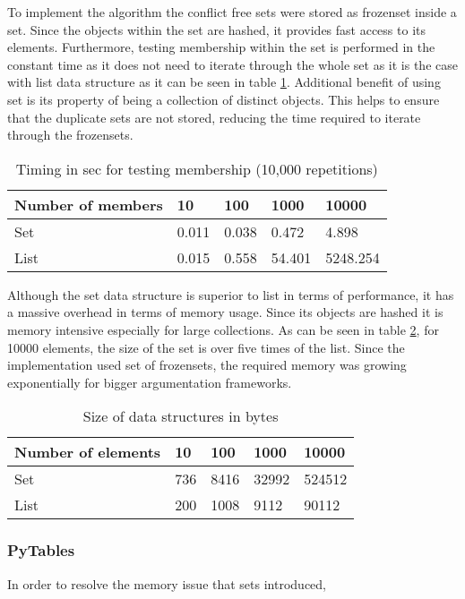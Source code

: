 To implement the algorithm the conflict free sets were stored as frozenset inside a set. Since the objects within the set are hashed, it provides fast access to its elements. Furthermore, testing membership within the set is performed in the constant time as it does not need to iterate through the whole set as it is the case with list data structure as it can be seen in table \ref{table:timingsMembership}. Additional benefit of using set is its property of being a collection of distinct objects. This helps to ensure that the duplicate sets are not stored, reducing the time required to iterate through the frozensets.

\begin{table}[h]
	\centering
	\caption{Timing in sec for testing membership (10,000 repetitions)}
	\label{table:timingsMembership}
	\begin{tabular}{lllll}
		\hline
		Number of members & 10    & 100   & 1000   & 10000 \\ \hline
		Set                & 0.011 & 0.038 & 0.472  & 4.898 \\
		List               & 0.015 & 0.558 & 54.401 & 5248.254 \\     
	\end{tabular}
\end{table}

Although the set data structure is superior to list in terms of performance, it has a massive overhead in terms of memory usage. Since its objects are hashed it is memory intensive especially for large collections. As can be seen in table \ref{table:sizeDataStructures}, for 10000 elements, the size of the set is over five times of the list. Since the implementation used set of frozensets, the required memory was growing exponentially for bigger argumentation frameworks.

\begin{table}[h]	
	\centering
	\caption{Size of data structures in bytes}
	\label{table:sizeDataStructures}
	\begin{tabular}{lllll}
		\hline
		Number of elements & 10  & 100  & 1000  & 10000  \\ \hline
		Set                & 736 & 8416 & 32992 & 524512 \\
		List               & 200 & 1008 & 9112  & 90112 
	\end{tabular}
\end{table}


\subsubsection{PyTables}
In order to resolve the memory issue that sets introduced, 


